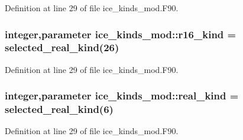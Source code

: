Definition at line 29 of file ice\_\-kinds\_\-mod.F90.\hypertarget{namespaceice__kinds__mod_ad334fc097ec7edf7543cd71a265c4680}{
\subsubsection[{r16\_\-kind}]{\setlength{\rightskip}{0pt plus 5cm}integer,parameter {\bf ice\_\-kinds\_\-mod::r16\_\-kind} = selected\_\-real\_\-kind(26)}}
\label{namespaceice__kinds__mod_ad334fc097ec7edf7543cd71a265c4680}


Definition at line 29 of file ice\_\-kinds\_\-mod.F90.\hypertarget{namespaceice__kinds__mod_a66f2774e6096156e4fe5914003097c72}{
\subsubsection[{real\_\-kind}]{\setlength{\rightskip}{0pt plus 5cm}integer,parameter {\bf ice\_\-kinds\_\-mod::real\_\-kind} = selected\_\-real\_\-kind(6)}}
\label{namespaceice__kinds__mod_a66f2774e6096156e4fe5914003097c72}


Definition at line 29 of file ice\_\-kinds\_\-mod.F90.